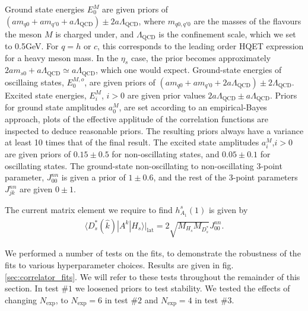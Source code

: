 Ground state energies $E_0^M$ are given priors of $(am_{q0} + am_{q'0} + a\Lambda_{\text{QCD}} )\pm 2a\Lambda_{\text{QCD}}$, where $m_{q0,q'0}$ are the masses of the flavours the meson $M$ is charged under, and $\Lambda_{\text{QCD}}$ is the confinement scale, which we set to 0.5GeV. For $q=h$ or $c$, this corresponds to the leading order HQET expression for a heavy meson mass. In the $\eta_s$ case, the prior becomes approximately $2am_{s0} + a\Lambda_{\text{QCD}} \simeq a\Lambda_{\text{QCD}}$, which one would expect. Ground-state energies of oscillaing states, $E_0^{M,o}$, are given priors of $(am_{q0} + am_{q'0} + 2 a\Lambda_{\text{QCD}})\pm 2\Lambda_{\text{QCD}}$. Excited state energies, $E_i^M$, $i>0$ are given prior values $2a\Lambda_{\text{QCD}}\pm a\Lambda_{\text{QCD}}$. Priors for ground state amplitudes $a_0^M$, are set according to an empirical-Bayes approach, plots of the effective applitude of the correlation functions are inspected to deduce reasonable priors. The resulting priors always have a variance at least 10 times that of the final result. The excited state amplitudes $a_i^M$,$i>0$ are given priors of $0.15\pm 0.5$ for non-oscillating states, and $0.05\pm 0.1$ for oscillating states. The ground-state non-oscillating to non-oscillating 3-point parameter, $J_{00}^{nn}$ is given a prior of $1\pm 0.6$, and the rest of the 3-point parameters $J_{jk}^{nn}$ are given $0\pm 1$.

The current matrix element we require to find $h_{A_1}^s(1)$ is given by
\begin{align}
  \langle D_s^*(\hat{k}) | A^k | H_s \rangle |_{\text{lat}} = 2 \sqrt{M_{H_s}M_{D_s^*}} J^{nn}_{00}.
  \label{eq:currentfit}
\end{align}

We performed a number of tests on the fits, to demonstrate the robustness of the fits to various hyperparameter choices. Results are given in fig. \ref{sec:correlator_fits}. We will refer to these tests throughout the remainder of this section. In test $\#1$ we loosened priors to test stability. We tested the effects of changing $N_{\text{exp}}$, to $N_{\text{exp}}=6$ in test $\#2$ and $N_{\text{exp}}=4$ in test $\#3$.

